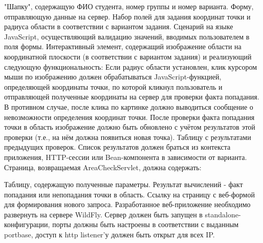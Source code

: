 \documentclass{article}
\begin{document}
"Шапку", содержащую ФИО студента, номер группы и номер варианта.
Форму, отправляющую данные на сервер.
Набор полей для задания координат точки и радиуса области в соответствии с вариантом задания.
Сценарий на языке JavaScript, осуществляющий валидацию значений, вводимых пользователем в поля формы.
Интерактивный элемент, содержащий изображение области на координатной плоскости (в соответствии с вариантом задания) и реализующий следующую функциональность:
Если радиус области установлен, клик курсором мыши по изображению должен обрабатываться JavaScript-функцией, определяющей координаты точки, по которой кликнул пользователь и отправляющей полученные координаты на сервер для проверки факта попадания.
В противном случае, после клика по картинке должно выводиться сообщение о невозможности определения координат точки.
После проверки факта попадания точки в область изображение должно быть обновлено с учётом результатов этой проверки (т.е., на нём должна появиться новая точка).
Таблицу с результатами предыдущих проверок. Список результатов должен браться из контекста приложения, HTTP-сессии или Bean-компонента в зависимости от варианта.
Страница, возвращаемая AreaCheckServlet, должна содержать:

Таблицу, содержащую полученные параметры.
Результат вычислений - факт попадания или непопадания точки в область.
Ссылку на страницу с веб-формой для формирования нового запроса.
Разработанное веб-приложение необходимо развернуть на сервере WildFly. Сервер должен быть запущен в standalone-конфигурации, порты должны быть настроены в соответствии с выданным portbase, доступ к http listener'у должен быть открыт для всех IP.
\end{document}
